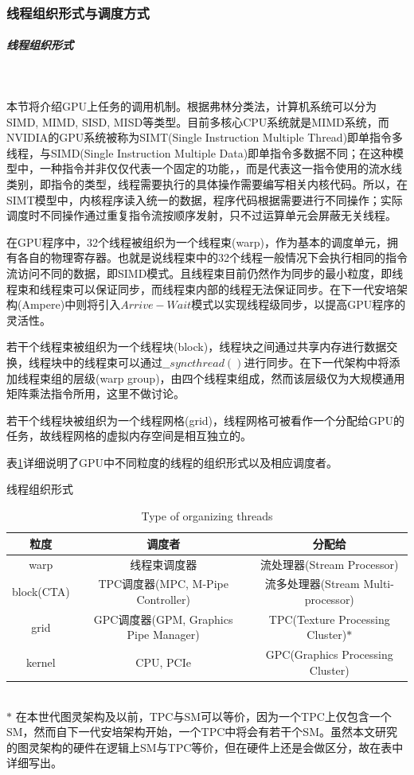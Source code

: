 \subsubsection{线程组织形式与调度方式}
\subparagraph{线程组织形式}~{}
\par 本节将介绍GPU上任务的调用机制。根据弗林分类法\cite{FLYNN}，计算机系统可以分为SIMD, MIMD, SISD, MISD等类型。目前多核心CPU系统就是MIMD系统，而NVIDIA的GPU系统被称为SIMT(Single Instruction Multiple Thread)即单指令多线程，与SIMD(Single Instruction Multiple Data)即单指令多数据不同；在这种模型中，一种指令并非仅仅代表一个固定的功能，，而是代表这一指令使用的流水线类别，即指令的类型，线程需要执行的具体操作需要编写相关内核代码。所以，在SIMT模型中，内核程序读入统一的数据，程序代码根据需要进行不同操作；实际调度时不同操作通过重复指令流按顺序发射，只不过运算单元会屏蔽无关线程。
\par 在GPU程序中，32个线程被组织为一个线程束(warp)，作为基本的调度单元，拥有各自的物理寄存器。也就是说线程束中的32个线程一般情况下会执行相同的指令流访问不同的数据，即SIMD模式。且线程束目前仍然作为同步的最小粒度，即线程束和线程束可以保证同步，而线程束内部的线程无法保证同步。在下一代安培架构(Ampere)中则将引入$ Arrive-Wait $模式以实现线程级同步，以提高GPU程序的灵活性。
\par 若干个线程束被组织为一个线程块(block)，线程块之间通过共享内存进行数据交换，线程块中的线程束可以通过$ \_\_syncthread() $进行同步。在下一代架构中将添加线程束组的层级(warp group)，由四个线程束组成，然而该层级仅为大规模通用矩阵乘法指令所用，这里不做讨论。
\par 若干个线程块被组织为一个线程网格(grid)，线程网格可被看作一个分配给GPU的任务，故线程网格的虚拟内存空间是相互独立的。
\par 表\ref{table-粒度}详细说明了GPU中不同粒度的线程的组织形式以及相应调度者。
\begin{table}
	\centering
	\renewcommand{\thetable}{\arabic{section}-\arabic{table} }
	\renewcommand{\tablename}{表}
	\caption{线程组织形式\cite{BLOCKDIAG}}
	\addtocounter{table}{-1}
	\renewcommand{\thetable}{\arabic{section}-\arabic{table} }
	\renewcommand{\tablename}{Table}
	\caption{Type of organizing threads\cite{BLOCKDIAG}}
	\begin{tabular}{ccc}
		\toprule
		粒度	&	调度者	& 	分配给 \\
		\midrule
		warp		&	线程束调度器	&	流处理器(Stream Processor)\\
		block(CTA)	&	TPC调度器(MPC, M-Pipe Controller)		  &		流多处理器(Stream Multi-processor)\\
		grid		&	GPC调度器(GPM, Graphics Pipe Manager)		  &		TPC(Texture Processing Cluster)$ * $\\
		kernel		&	CPU, PCIe			&		GPC(Graphics Processing Cluster)	\\	
		\bottomrule
	\end{tabular} \label{table-粒度}\\
	
	$ * $ 在本世代图灵架构及以前，TPC与SM可以等价，因为一个TPC上仅包含一个SM，然而自下一代安培架构开始，一个TPC中将会有若干个SM。虽然本文研究的图灵架构的硬件在逻辑上SM与TPC等价，但在硬件上还是会做区分，故在表中详细写出。
\end{table}
